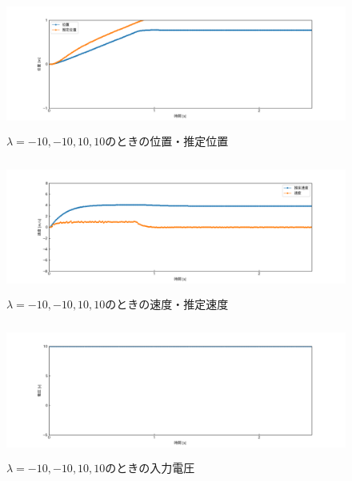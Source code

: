 \documentclass[12pt]{jsarticle}
\begin{document}
\begin{figure}[H]
  \begin{center}
    \includegraphics[clip,width=13.0cm, height=4.4cm]{../img/Exp5-1.png}
    \caption{$\lambda=-10, -10, 10, 10$のときの位置・推定位置}
    \label{Exp5-1}
  \end{center}
\end{figure}
\begin{figure}[H]
  \begin{center}
    \includegraphics[clip,width=13.0cm, height=4.4cm]{../img/Exp5-2.png}
    \caption{$\lambda=-10, -10, 10, 10$のときの速度・推定速度}
    \label{Exp5-2}
  \end{center}
\end{figure}
\begin{figure}[H]
  \begin{center}
    \includegraphics[clip,width=13.0cm, height=4.4cm]{../img/Exp5-3.png}
    \caption{$\lambda=-10, -10, 10, 10$のときの入力電圧}
    \label{Exp5-3}
  \end{center}
\end{figure}
\end{document}
